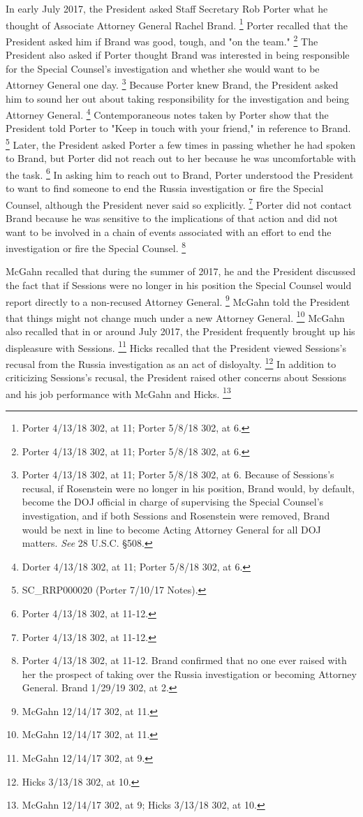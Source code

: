 {In early July 2017, the President asked Staff Secretary Rob Porter what he thought of Associate Attorney General Rachel Brand.%
\footnote{Porter 4/13/18 302, at 11;
Porter 5/8/18 302, at 6.}
Porter recalled that the President asked him if Brand was good, tough, and "on the team."%
\footnote{Porter 4/13/18 302, at 11;
Porter 5/8/18 302, at 6.}
The President also asked if Porter thought Brand was interested in being responsible for the Special Counsel's investigation and whether she would want to be Attorney General one day.%
\footnote{Porter 4/13/18 302, at 11;
Porter 5/8/18 302, at 6.
Because of Sessions’s recusal, if Rosenstein were no longer in his position, Brand would, by default, become the DOJ official in charge of supervising the Special Counsel’s investigation, and if both Sessions and Rosenstein were removed, Brand would be next in line to become Acting Attorney General for all DOJ matters.
\textit{See} 28 U.S.C. \S 508.}
Because Porter knew Brand, the President asked him to sound her out about taking responsibility for the investigation and being Attorney General.%
\footnote{Dorter 4/13/18 302, at 11;
Porter 5/8/18 302, at 6.}
Contemporaneous notes taken by Porter show that the President told Porter to "Keep in touch with your friend," in reference to Brand.%
\footnote{SC\_RRP000020 (Porter 7/10/17 Notes).}
Later, the President asked Porter a few times in passing whether he had spoken to Brand, but Porter did not reach out to her because he was uncomfortable with the task.%
\footnote{Porter 4/13/18 302, at 11-12.}
In asking him to reach out to Brand, Porter understood the President to want to find someone to end the Russia investigation or fire the Special Counsel, although the President never said so explicitly.%
\footnote{Porter 4/13/18 302, at 11-12.}
Porter did not contact Brand because he was sensitive to the implications of that action and did not want to be involved in a chain of events associated with an effort to end the investigation or fire the Special Counsel.%
\footnote{Porter 4/13/18 302, at 11-12.
Brand confirmed that no one ever raised with her the prospect of taking over the Russia investigation or becoming Attorney General.
Brand 1/29/19 302, at 2.}

McGahn recalled that during the summer of 2017, he and the President discussed the fact that if Sessions were no longer in his position the Special Counsel would report directly to a non-recused Attorney General.%
\footnote{McGahn 12/14/17 302, at 11.}
McGahn told the President that things might not change much under a new Attorney General.%
\footnote{McGahn 12/14/17 302, at 11.}
McGahn also recalled that in or around July 2017, the President frequently brought up his displeasure with Sessions.%
\footnote{McGahn 12/14/17 302, at 9.}
Hicks recalled that the President viewed Sessions's recusal from the Russia investigation as an act of disloyalty.%
\footnote{Hicks 3/13/18 302, at 10.}
In addition to criticizing Sessions's recusal, the President raised other concerns about Sessions and his job performance with McGahn and Hicks.%
\footnote{McGahn 12/14/17 302, at 9;
Hicks 3/13/18 302, at 10.}

}
